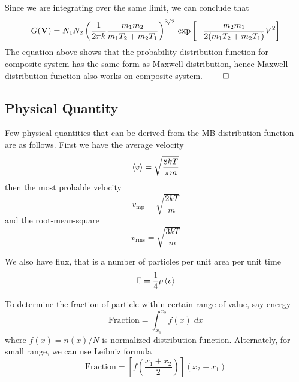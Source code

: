 \documentclass[../../../Main.tex]{subfiles}
\begin{document}
Since we are integrating over the same limit, we can conclude that 
\begin{equation*}
    G(\mathbf{V})= N_1 N_2 \left(\frac{1}{2\pi k}\frac{m_1m_2}{m_1T_2+ m_2T_1}\right)^{3/2}\\
    \exp \left[-\frac{m_2m_1}{2 (m_1T_2+ m_2T_1)} V^2\right] 
\end{equation*} 
The equation above shows that the probability distribution function for composite system has the same form as Maxwell distribution, hence Maxwell distribution function also works on composite system. $\qed$

\subsection*{Physical Quantity}
Few physical quantities that can be derived from the MB distribution function are as follows. First we have the average velocity
\begin{equation*}
    \braket{v}=\sqrt{\frac{8kT}{\pi m}}
\end{equation*}
then the most probable velocity 
\begin{equation*}
    v_\text{mp}=\sqrt{\frac{2kT}{m}}
\end{equation*}
and the root-mean-square 
\begin{equation*}
    v_\text{rms}=\sqrt{\frac{3kT}{m}}
\end{equation*}

We also have flux, that is a number of particles per unit area per unit time
\begin{equation*}
    \Gamma=\frac{1}{4}\rho\braket{v}
\end{equation*}

To determine the fraction of particle within certain range of value, say energy
\begin{equation*}
    \text{Fraction}=\int_{x_1}^{x_2}f(x)\;dx
\end{equation*}
where $f(x)=n(x)/N$ is normalized distribution function. Alternately, for small range, we can use Leibniz formula
\begin{equation*}
    \text{Fraction}=\left[f\left(\frac{x_1+x_2}{2}\right)\right](x_2-x_1)
\end{equation*}
\end{document}

